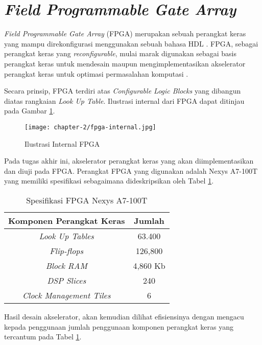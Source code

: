 \section{\textit{Field Programmable Gate Array}}

\textit{Field Programmable Gate Array} (\ac{FPGA}) merupakan sebuah perangkat keras yang mampu direkonfigurasi menggunakan sebuah bahasa \ac{HDL} \parencite{smith2024FPGA}. \ac{FPGA}, sebagai perangkat keras yang \textit{reconfigurable}, mulai marak digunakan sebagai basis perangkat keras untuk mendesain maupun mengimplementasikan akselerator perangkat keras untuk optimasi permasalahan komputasi \parencite{gerlach2023fpgaplacement}.

Secara prinsip, \ac{FPGA} terdiri atas \textit{Configurable Logic Blocks} yang dibangun diatas rangkaian \textit{Look Up Table}. Ilustrasi internal dari \ac{FPGA} dapat ditinjau pada Gambar \ref{fig:ilustrasi-internal-fpga}.

\begin{figure}[h]
	\centering
	\texttt{[image: chapter-2/fpga-internal.jpg]}
	\caption{Ilustrasi Internal FPGA \parencite{md2015field}}
	\label{fig:ilustrasi-internal-fpga}
\end{figure}

Pada tugas akhir ini, akselerator perangkat keras yang akan diimplementasikan dan diuji pada \ac{FPGA}. Perangkat \ac{FPGA} yang digunakan adalah Nexys A7-100T yang memiliki spesifikasi sebagaimana dideskripsikan oleh Tabel \ref{tab:nexys-specs}.

\begin{table}[h]
	\caption{Spesifikasi \ac{FPGA} Nexys A7-100T}
	\label{tab:nexys-specs}
	\vspace{0.25cm}
	\begin{center}
		\begin{tabular}{|c|c|}
			\hline
			Komponen Perangkat Keras        & Jumlah \tabularnewline
			\hline
			\textit{Look Up Tables}         & 63.400 \tabularnewline
			\textit{Flip-flops}             & 126,800 \tabularnewline
			\textit{Block RAM}              & 4,860 Kb \tabularnewline
			\textit{DSP Slices}             & 240 \tabularnewline
			\textit{Clock Management Tiles} & 6 \tabularnewline
			\hline
		\end{tabular}
	\end{center}
\end{table}

Hasil desain akselerator, akan kemudian dilihat efisiensinya dengan mengacu kepada penggunaan jumlah penggunaan komponen perangkat keras yang tercantum pada Tabel \ref{tab:nexys-specs}.

